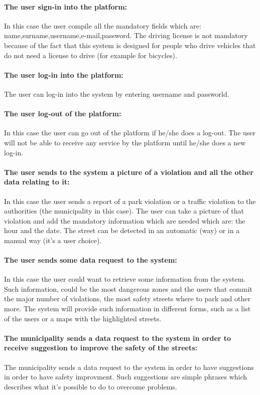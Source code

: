 \documentclass[titlepage]{article}
\begin{document}
\paragraph{The user sign-in into the platform: }
In this case the user compile all the mandatory fields which are: name,surname,username,e-mail,password. The driving license is not mandatory because of the fact that this system is designed for people who drive vehicles that do not need a license to drive (for example for bicycles).
\paragraph{The user log-in into the platform: }
The user can log-in into the system by entering username and passworld.
\paragraph{The user log-out of the platform:}
In this case the user can go out of the platform if he/she does a log-out. The user will not be able to receive any service by the platform until he/she does a new log-in.
\paragraph{The user sends to the system a picture of a            	violation and all the other data relating to it: }
In this case the user sends a report of a park violation or a traffic violation to the authorities (the municipality in this case). The user can take a picture of that violation and add the mandatory information which are needed which are: the hour and the date. The street can be detected in an automatic (way) or in a manual way (it's a user choice).
\paragraph{The user sends some data request to the system: }
In this case the user could want to retrieve some information from the system. Such information, could be the most dangerous zones and the users that commit the major number of violations, the most safety streets where to park and other more. The system will provide such information in different forms, such as a list of the users or a maps with the highlighted streets.
\paragraph{The municipality sends a data request to the 				   system  in order to receive suggestion to improve 			   the 	safety 	of the streets: }
The municipality sends a data request to the system in order to have suggestions in order to have safety improvment. Such suggestions are simple phrases which describes what it's possible to do to overcome problems.
\end{document}
